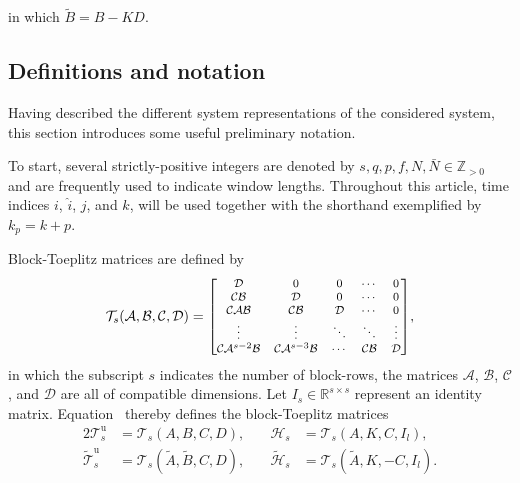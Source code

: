 in which $\tilde{B}=B-KD$.
%
%
%
\subsection{Definitions and notation}\label{sec:notation}
Having described the different system representations of the considered system, this section introduces some useful preliminary notation.

To start, several strictly-positive integers are denoted by $s,q,p,f,N,\bar{N}\in\mathbb{Z}_{>0}$ and are frequently used to indicate window lengths. Throughout this article, time indices $i$, $\hat{i}$, $j$, and $k$, will be used together with the shorthand exemplified by $k_p=k+p$.

Block-Toeplitz matrices are defined by
\begin{align}\label{eqn:blockToeplitz} 
\mathcal{T}_s(\mathcal{A},\mathcal{B},\mathcal{C},\mathcal{D}) =\scriptsize{
	\begin{bmatrix}
		\mathcal{D}         & 0         & 0      & \cdots  & 0\\
		\mathcal{C}\mathcal{B}        & \mathcal{D}         & 0      & \cdots  & 0\\
		\mathcal{C}\mathcal{A}\mathcal{B}       & \mathcal{C}\mathcal{B}        & \mathcal{D}      & \cdots & 0\\
		\vdots    &  \vdots & \ddots & \ddots & \vdots\\
		\mathcal{C}\mathcal{A}^{s-2}\mathcal{B} & \mathcal{C}\mathcal{A}^{s-3}\mathcal{B} & \cdots  & \mathcal{C}\mathcal{B}     & \mathcal{D}
	\end{bmatrix}},
\end{align}
in which the subscript $s$ indicates the number of block-rows, the matrices $\mathcal{A}$, $\mathcal{B}$, $\mathcal{C}$, and $\mathcal{D}$ are all of compatible dimensions. Let ${I_s\in\mathbb{R}^{s\times s}}$ represent an identity matrix. Equation~ thereby defines the block-Toeplitz matrices
\begin{alignat*}{2}
\mathcal{T}_s^\mathrm{u}&=\mathcal{T}_s(A,B,C,D),\quad  &\mathcal{H}_s&=\mathcal{T}_s(A,K,C,I_l),\\
\widetilde{\mathcal{T}}_s^\mathrm{u}&=\mathcal{T}_s(\tilde{A},\tilde{B},C,D),\quad  &\widetilde{\mathcal{H}}_s&=\mathcal{T}_s(\tilde{A},K,-C,I_l).
\end{alignat*}

